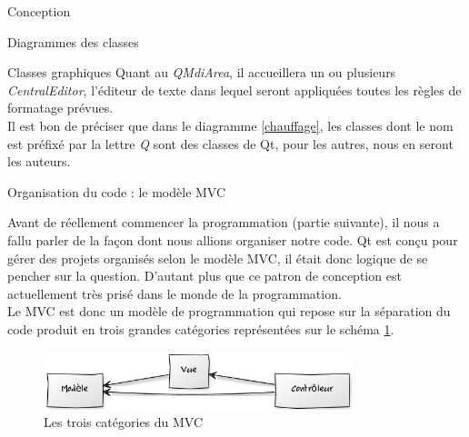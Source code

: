 \documentclass[a4paper, 12pt]{report}
\begin{document}
\begin{part}{Conception}
\begin{chapter}{Diagrammes des classes}
\begin{section}{Classes graphiques}
				Quant au \emph{QMdiArea}, il accueillera un ou plusieurs \emph{CentralEditor}, l'éditeur de texte dans lequel seront appliquées
				toutes les règles de formatage prévues.\\

				Il est bon de préciser que dans le diagramme \ref{chauffage}, les classes dont le nom est préfixé par la lettre \emph{Q}
				sont des classes de \gls{Qt}, pour les autres, nous en seront les auteurs.
			\end{section}
		\end{chapter}
		\begin{chapter}{Organisation du code : le modèle MVC}

			Avant de réellement commencer la programmation (partie suivante), il nous a fallu parler de la façon dont nous allions organiser
			notre code. \gls{Qt} est conçu pour gérer des projets organisés selon le modèle \gls{MVC}, il était donc logique de se pencher
			sur la question. D'autant plus que ce patron de conception est actuellement très prisé dans le monde de la programmation.\\


			Le \gls{MVC} est donc un modèle de programmation qui repose sur la séparation du code produit en trois grandes catégories
			représentées sur le schéma \ref{sinistre}.\\
			\begin{figure}[ht]
					\begin{center}
						\includegraphics[width=9cm]{images/mvc.png}
						\caption{Les trois catégories du MVC}
						\label{sinistre}
					\end{center}
				\end{figure}~\\



\end{chapter}
\end{part}
\end{document}
